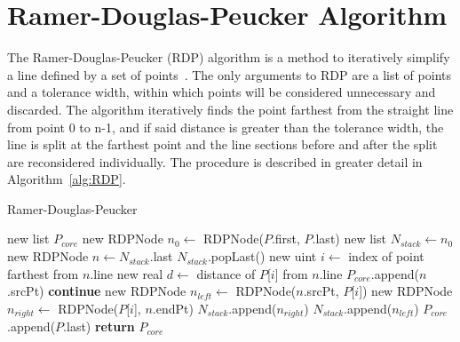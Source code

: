 \section{Ramer-Douglas-Peucker Algorithm}\label{sec:RDP}
The Ramer-Douglas-Peucker (RDP) algorithm is a method to iteratively simplify a line defined by a set of points~\cite{RDP_line_reduction_DP, RDP_line_reduction_R}.
The only arguments to RDP are a list of points and a tolerance width, within which points will be considered unnecessary and discarded.
The algorithm iteratively finds the point farthest from the straight line from point 0 to n-1, and if said distance is greater than the tolerance width, the line is split at the farthest point and the line sections before and after the split are reconsidered individually.
The procedure is described in greater detail in Algorithm~\ref{alg:RDP}.

\begin{algorithm}[htb]
\caption{Ramer-Douglas-Peucker}\label{alg:RDP}
\begin{algorithmic}[1]
	\State new list $P_{core}$
	\State new RDPNode $n_0 \leftarrow$ RDPNode($P$.first, $P$.last)
	\State new list $N_{stack} \leftarrow n_0$
		\State new RDPNode $n \leftarrow N_{stack}$.last
		\State $N_{stack}$.popLast()
		\State new uint $i \leftarrow$ index of point farthest from $n$.line
		\State new real $d \leftarrow$ distance of $P$[$i$] from $n$.line
		 
			\State $P_{core}$.append($n$.srcPt) 
			\State \textbf{continue}
		\EndIf
		\State new RDPNode $n_{left} \leftarrow$ RDPNode($n$.srcPt, $P$[$i$])
		\State new RDPNode $n_{right} \leftarrow$ RDPNode($P$[$i$], $n$.endPt)
		\State $N_{stack}$.append($n_{right}$)
		\State $N_{stack}$.append($n_{left}$)
	\EndWhile
	\State $P_{core}$.append($P$.last)
	\State \textbf{return} $P_{core}$
\EndFunction
\end{algorithmic}
\end{algorithm}

